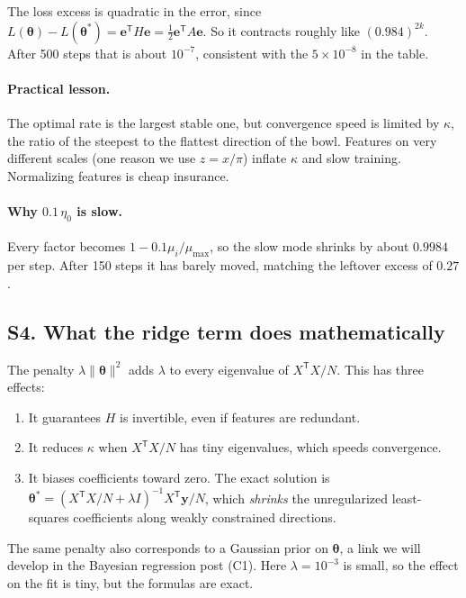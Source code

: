 \documentclass[11pt]{article}
\newcommand{\T}{\mathsf{T}}
\newcommand{\vth}{\bm{\theta}}
\begin{document}
The loss excess is quadratic in the error, since $L(\vth)-L(\vth^\ast)=\mathbf e^{\T}H\mathbf e=\tfrac12\mathbf e^{\T}A\mathbf e$. So it contracts roughly like $(0.984)^{2k}$. After 500 steps that is about $10^{-7}$, consistent with the $5\times10^{-8}$ in the table.

\paragraph{Practical lesson.} The optimal rate is the largest stable one, but convergence speed is limited by $\kappa$, the ratio of the steepest to the flattest direction of the bowl. Features on very different scales (one reason we use $z=x/\pi$) inflate $\kappa$ and slow training. Normalizing features is cheap insurance.

\paragraph{Why $0.1\,\eta_0$ is slow.} Every factor becomes $1-0.1\mu_i/\mu_{\max}$, so the slow mode shrinks by about $0.9984$ per step. After 150 steps it has barely moved, matching the leftover excess of $0.27$.

\subsection*{S4. What the ridge term does mathematically}
The penalty $\lambda\lVert\vth\rVert^2$ adds $\lambda$ to every eigenvalue of $X^{\T}X/N$. This has three effects:
\begin{enumerate}[nosep]
  \item It guarantees $H$ is invertible, even if features are redundant.
  \item It reduces $\kappa$ when $X^{\T}X/N$ has tiny eigenvalues, which speeds convergence.
  \item It biases coefficients toward zero. The exact solution is $\vth^\ast=(X^{\T}X/N+\lambda I)^{-1}X^{\T}\mathbf y/N$, which \emph{shrinks} the unregularized least-squares coefficients along weakly constrained directions.
\end{enumerate}
The same penalty also corresponds to a Gaussian prior on $\vth$, a link we will develop in the Bayesian regression post (C1). Here $\lambda=10^{-3}$ is small, so the effect on the fit is tiny, but the formulas are exact.
\end{document}
